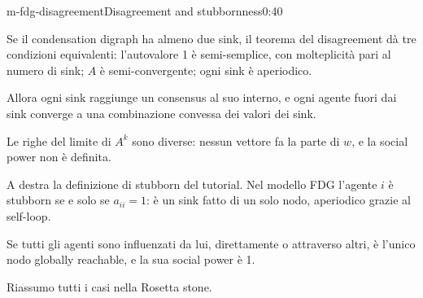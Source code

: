\begin{slide}{m-fdg-disagreement}{Disagreement and stubbornness}{0:40}
  \begin{discorso}
    \item Se il condensation digraph ha almeno due sink, il teorema del disagreement dà tre condizioni equivalenti: l'autovalore 1 è semi-semplice, con molteplicità pari al numero di sink; $A$ è semi-convergente; ogni sink è aperiodico.
    \item Allora ogni sink raggiunge un consensus al suo interno, e ogni agente fuori dai sink converge a una combinazione convessa dei valori dei sink.
    \item Le righe del limite di $A^k$ sono diverse: nessun vettore fa la parte di $w$, e la social power non è definita.
    \item A destra la definizione di stubborn del tutorial. Nel modello FDG l'agente $i$ è stubborn se e solo se $a_{ii}=1$: è un sink fatto di un solo nodo, aperiodico grazie al self-loop.
    \item Se tutti gli agenti sono influenzati da lui, direttamente o attraverso altri, è l'unico nodo globally reachable, e la sua social power è 1.
    \item {\color{blue}Riassumo tutti i casi nella Rosetta stone.}
    \item {\color{red}         }
  \end{discorso}
\end{slide}

